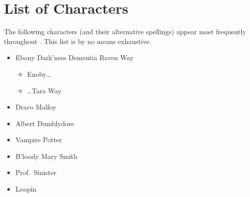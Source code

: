 \cleardoublepage\chapter{List of Characters}

The following characters (and their alternative spellings)
appear most frequently throughout .
This list is by no means exhaustive.

\begin{itemize}
	\item Ebony Dark'ness Dementia Raven Way
			\\{\small\vspace{-2em}%
					\begin{itemize}[label={}]%
						\item Enoby\ldots
						\item \ldots Tara Way
					\end{itemize}%
			}
	\item Draco Malfoy
	\item Albert Dumblydore
	\item Vampire Potter
	\item B'loody Mary Smith
	\item Prof.~Sinister
	\item Loopin
\end{itemize}
